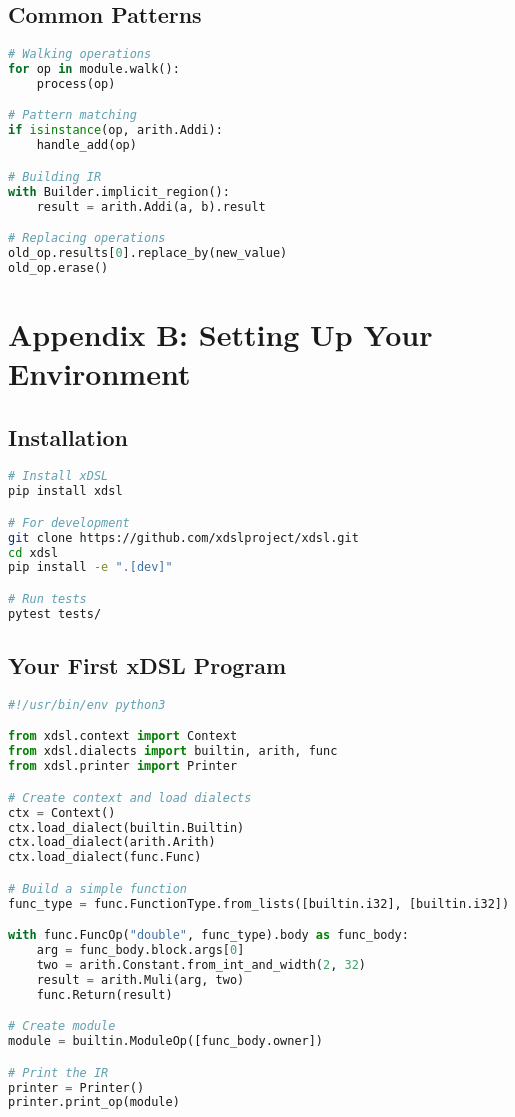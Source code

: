 \documentclass[11pt,a4paper]{article}
\begin{document}
\subsection{Common Patterns}

\begin{lstlisting}[language=Python, caption=Common xDSL Patterns]
# Walking operations
for op in module.walk():
    process(op)

# Pattern matching
if isinstance(op, arith.Addi):
    handle_add(op)

# Building IR
with Builder.implicit_region():
    result = arith.Addi(a, b).result

# Replacing operations
old_op.results[0].replace_by(new_value)
old_op.erase()
\end{lstlisting}

\section{Appendix B: Setting Up Your Environment}

\subsection{Installation}

\begin{lstlisting}[language=bash, caption=Installing xDSL]
# Install xDSL
pip install xdsl

# For development
git clone https://github.com/xdslproject/xdsl.git
cd xdsl
pip install -e ".[dev]"

# Run tests
pytest tests/
\end{lstlisting}

\subsection{Your First xDSL Program}

\begin{lstlisting}[language=Python, caption=hello_compiler.py]
#!/usr/bin/env python3

from xdsl.context import Context
from xdsl.dialects import builtin, arith, func
from xdsl.printer import Printer

# Create context and load dialects
ctx = Context()
ctx.load_dialect(builtin.Builtin)
ctx.load_dialect(arith.Arith)
ctx.load_dialect(func.Func)

# Build a simple function
func_type = func.FunctionType.from_lists([builtin.i32], [builtin.i32])

with func.FuncOp("double", func_type).body as func_body:
    arg = func_body.block.args[0]
    two = arith.Constant.from_int_and_width(2, 32)
    result = arith.Muli(arg, two)
    func.Return(result)

# Create module
module = builtin.ModuleOp([func_body.owner])

# Print the IR
printer = Printer()
printer.print_op(module)
\end{lstlisting}
\end{document}
